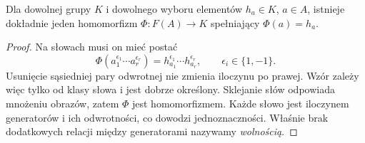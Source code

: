 \begin{stwierdzenie}
\label{prop:free-universal-5}
Dla dowolnej grupy $K$ i dowolnego wyboru
elementów $h_a\in K$, $a\in A$, istnieje
dokładnie jeden homomorfizm $\Phi:F(A)\to K$
spełniający $\Phi(a)=h_a$.
\end{stwierdzenie}
\begin{proof}
Na słowach musi on mieć postać
\[
 \Phi(a_1^{\epsilon_1}\cdots a_r^{\epsilon_r})
 =h_{a_1}^{\epsilon_1}\cdots h_{a_r}^{\epsilon_r},
 \qquad \epsilon_i\in\{1,-1\}.
\]
Usunięcie sąsiedniej pary odwrotnej nie zmienia
iloczynu po prawej. Wzór zależy więc tylko
od klasy słowa i jest dobrze określony.
Sklejanie słów odpowiada mnożeniu obrazów,
zatem $\Phi$ jest homomorfizmem.
Każde słowo jest iloczynem generatorów
i ich odwrotności, co dowodzi jednoznaczności.
Właśnie brak dodatkowych relacji między
generatorami nazywamy \emph{wolnością}.
\end{proof}

